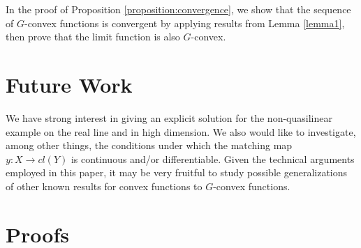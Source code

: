 \documentclass[a4paper, 11pt]{amsart}
\numberwithin{equation}{section}
\theoremstyle{plain}
\theoremstyle{definition}
\theoremstyle{remark}
\begin{document}
In the proof of Proposition \ref{proposition:convergence}, we show that the sequence of $G$-convex functions is convergent by applying results from Lemma \ref{lemma1}, then prove that the limit function is also $G$-convex. \medskip



\bigskip





\section{Future Work}\label{section:futurework}

We have strong interest in giving an explicit solution for the non-quasilinear example on the real line and in high dimension. We also would like to investigate, among other things, the conditions under which the matching map $y: X \longrightarrow cl(Y)$ is continuous and/or differentiable. Given the technical arguments employed in this paper, it may be very fruitful to study possible generalizations of other known results for convex functions to $G$-convex functions.




\bigskip



\section{Proofs}\label{section:proofs}
\end{document}
